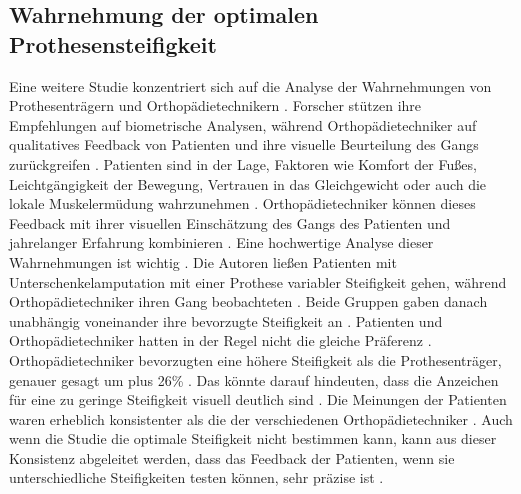 \subsection{Wahrnehmung der optimalen Prothesensteifigkeit} %
Eine weitere Studie konzentriert sich auf die Analyse der Wahrnehmungen von Prothesenträgern und Orthopädietechnikern \cite{Shepherd.2020}. Forscher stützen ihre Empfehlungen auf biometrische Analysen, während Orthopädietechniker auf qualitatives Feedback von Patienten und ihre visuelle Beurteilung des Gangs zurückgreifen \cite{Shepherd.2020}. Patienten sind in der Lage, Faktoren wie Komfort der Fußes, Leichtgängigkeit der Bewegung, Vertrauen in das Gleichgewicht oder auch die lokale Muskelermüdung wahrzunehmen \cite{Shepherd.2020}. Orthopädietechniker können dieses Feedback mit ihrer visuellen Einschätzung des Gangs des Patienten und jahrelanger Erfahrung kombinieren \cite{Shepherd.2020}. Eine hochwertige Analyse dieser Wahrnehmungen ist wichtig \cite{Shepherd.2020}. Die Autoren ließen Patienten mit Unterschenkelamputation mit einer Prothese variabler Steifigkeit gehen, während Orthopädietechniker ihren Gang beobachteten \cite{Shepherd.2020}. Beide Gruppen gaben danach unabhängig voneinander ihre bevorzugte Steifigkeit an \cite{Shepherd.2020}.
Patienten und Orthopädietechniker hatten in der Regel nicht die gleiche Präferenz \cite{Shepherd.2020}. Orthopädietechniker bevorzugten eine höhere Steifigkeit als die Prothesenträger, genauer gesagt um plus 26\% \cite{Shepherd.2020}. Das könnte darauf hindeuten, dass die Anzeichen für eine zu geringe Steifigkeit visuell deutlich sind \cite{Shepherd.2020}.
Die Meinungen der Patienten waren erheblich konsistenter als die der verschiedenen Orthopädietechniker \cite{Shepherd.2020}. Auch wenn die Studie die optimale Steifigkeit nicht bestimmen kann, kann aus dieser Konsistenz abgeleitet werden, dass das Feedback der Patienten, wenn sie unterschiedliche Steifigkeiten testen können, sehr präzise ist \cite{Shepherd.2020}.

